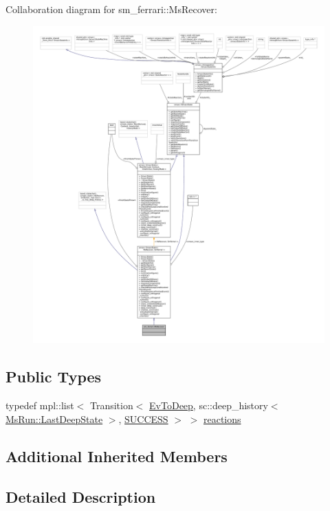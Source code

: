 Collaboration diagram for sm\+\_\+ferrari\+:\+:Ms\+Recover\+:
\nopagebreak
\begin{figure}[H]
\begin{center}
\leavevmode
\includegraphics[width=350pt]{classsm__ferrari_1_1MsRecover__coll__graph}
\end{center}
\end{figure}
\subsection*{Public Types}
\begin{DoxyCompactItemize}
\item 
typedef mpl\+::list$<$ Transition$<$ \hyperlink{structsm__ferrari_1_1EvToDeep}{Ev\+To\+Deep}, sc\+::deep\+\_\+history$<$ \hyperlink{classsmacc_1_1SmaccState_a60088405d2d99d468caa0baa3b2830a8}{Ms\+Run\+::\+Last\+Deep\+State} $>$, \hyperlink{classSUCCESS}{S\+U\+C\+C\+E\+SS} $>$ $>$ \hyperlink{classsm__ferrari_1_1MsRecover_ae1fd3367d4671139a433e24c71f8b9b3}{reactions}
\end{DoxyCompactItemize}
\subsection*{Additional Inherited Members}


\subsection{Detailed Description}


